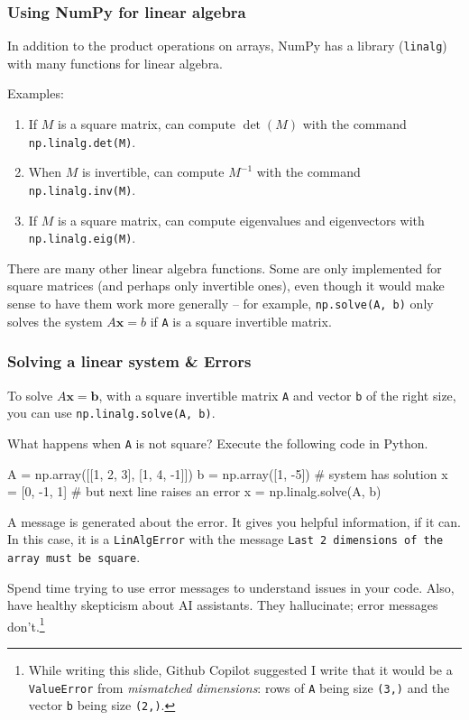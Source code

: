 \documentclass{beamer}
\newenvironment{codeblock}
    {\hfill\begin{beamerboxesrounded}[lower=codecol, width=0.8\textwidth]
    \medskip

    }
    { 
    \end{beamerboxesrounded}\hfill
    }
\theoremstyle{example}
\newcommand{\ttt}[1]{{\small\texttt{#1}}}
\begin{document}
\begin{frame}
\frametitle{Using NumPy for linear algebra}
In addition to the product operations on arrays, NumPy has a library (\ttt{linalg}) with many functions for linear algebra. 

Examples: 
\begin{enumerate}
    \item If $M$ is a square matrix, can compute $\det(M)$ with the command \ttt{np.linalg.det(M)}.
    \item When $M$ is invertible, can compute $M^{-1}$ with the command \ttt{np.linalg.inv(M)}.
    \item If $M$ is a square matrix, can compute eigenvalues and eigenvectors with \ttt{np.linalg.eig(M)}. 
\end{enumerate}

There are many other linear algebra functions. Some are only implemented for square matrices (and perhaps only invertible ones), even though it would make sense to have them work more generally {--} for example, \ttt{np.solve(A, b)} only solves the system $A\mathbf{x} = b$ if \ttt{A} is a square invertible matrix.
\end{frame}

\begin{frame}[fragile]
\frametitle{Solving a linear system \& Errors}
To solve $A\mathbf{x} = \mathbf{b}$, with a square invertible matrix \ttt{A} and vector \ttt{b} of the right size, you can use \ttt{np.linalg.solve(A, b)}.

What happens when \ttt{A} is not square? Execute the following code in Python.

\begin{codeblock}

\begin{python}
    A = np.array([[1, 2, 3], [1, 4, -1]])
    b = np.array([1, -5])
    # system has solution x = [0, -1, 1]
    # but next line raises an error
    x = np.linalg.solve(A, b)
\end{python}

\end{codeblock}

A message is generated about the error. It gives you helpful information, if it can. In this case, it is a \ttt{LinAlgError} with the message \ttt{Last 2 dimensions of the array must be square}.

Spend time trying to use error messages to understand issues in your code. Also, have healthy skepticism about AI assistants. They hallucinate; error messages don't.\footnote{While writing this slide, Github Copilot suggested I write that it would be a \ttt{ValueError} from \emph{mismatched dimensions}: rows of \ttt{A} being size \ttt{(3,)} and the vector \ttt{b} being size \ttt{(2,)}.}
\end{frame}
\end{document}
